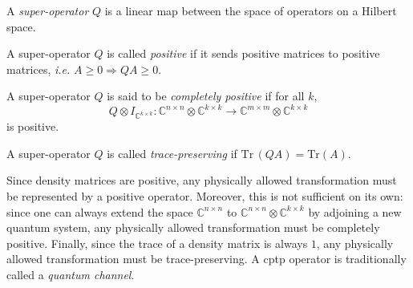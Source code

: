 
\begin{definition}
  A \emph{super-operator} $Q$ is a linear map between the space of operators on a Hilbert space. 
\end{definition}

\begin{definition} \label{def:positive_superoperator}
  A super-operator $Q$ is called \emph{positive} if it sends positive matrices to positive matrices, \textit{i.e.} $A \geq 0 \Rightarrow{} Q A \geq 0$.
\end{definition}

\begin{definition} \label{def:completely_positive_superoperator}
  A super-operator $Q$ is said to be \emph{completely positive} if for all $k$, 
  $$Q \otimes I_{\mathbb{C}^{k \times k}}: \mathbb{C}^{n \times n} \otimes \mathbb{C}^{k \times k} \rightarrow \mathbb{C}^{m \times m} \otimes \mathbb{C}^{k \times k}  $$
   is positive.
\end{definition}

\begin{definition} \label{def:trace_preserving_superoperator}
  A super-operator $Q$ is called \emph{trace-preserving} if $\text{Tr} \hspace{2pt} (Q A)= \text{Tr} (A)$.
\end{definition}

Since density matrices are positive, any physically allowed transformation must be represented by a positive operator. Moreover, this is not sufficient on its own: since one can always extend the space $\mathbb{C}^{n \times n}$ to  $\mathbb{C}^{n \times n} \otimes \mathbb{C}^{k \times k} $ by adjoining a new quantum system, any physically allowed transformation must be completely positive. Finally, since the trace of a density matrix is always $1$, any physically allowed transformation must be trace-preserving. A \acrfull{cptp} operator is traditionally called a \emph{quantum channel}.

